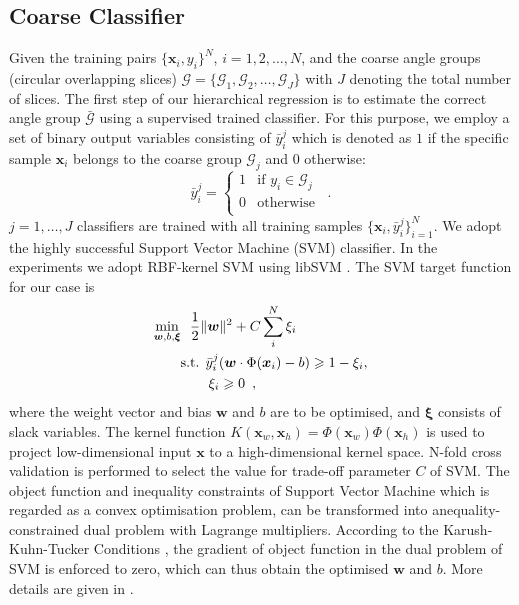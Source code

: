 \documentclass{tutmscthesis}[2010/09/22]
\numberwithin{equation}{section}
\numberwithin{table}{section}
\numberwithin{figure}{section}
\renewcommand{\vec}[1]{\bm{#1}}
\begin{document}
\subsection{Coarse Classifier}
\label{sec:coarse_classifier}
Given the training pairs $\{\vec{x}_{i}, y_{i}\}^N$,
$i=1, 2, \ldots, N$, and the coarse angle groups (circular
overlapping slices)
$\mathcal{G} = \{\mathcal{G}_1, \mathcal{G}_2, \ldots, \mathcal{G}_J\}$
with $J$ denoting the total number of slices. The first step
of our hierarchical regression is to estimate the correct angle
group $\bar{\mathcal{G}}$ using a supervised trained classifier.
For this purpose, we employ a set of binary output variables consisting of $\bar{y}_i^j$ which is denoted as $1$ if the specific sample $\vec{x}_i$ belongs to the coarse group $\mathcal{G}_j$ and $0$ otherwise:
\begin{equation}
\bar{y}_i^j =  \left\{ \begin{array}{ll}
1 & \textrm{if $y_i \in \mathcal{G}_j $}\\
0 & \textrm{otherwise}\\
\end{array} \right. \enspace .
\end{equation}
$j=1, \ldots, J$ classifiers are trained with all training samples
$\{\vec{x}_i,\bar{y}_i^j\}^N_{i=1}$. We adopt the highly successful
Support Vector Machine (SVM) classifier. In the experiments
we adopt RBF-kernel SVM using libSVM \cite{chang2011libsvm}.
The SVM target function for our case is
\begin{equation}
\begin{split}
  \min_{\vec{w},b,\vec{\xi}}&~~\frac{1}{2}\| \vec{w} \|^2+C\sum_i^N \xi_i\\
  &\hbox{s.t. } \bar{y}_i^j(\vec{w}\cdot \Phi(\vec{x}_i)-b) \geqslant 1 - \xi_i ,\\
  &      ~~~~~~\xi_i \geqslant 0 \enspace,
\end{split}\label{eq:svm}
\end{equation}
where the weight vector and bias $\vec{w}$ and $b$ are to be optimised,
and $\vec{\xi}$ consists of slack
variables. 
The kernel function $K(\vec{x}_w,\vec{x}_h)=\Phi(\vec{x}_w)\Phi(\vec{x}_h)$ is
used to project low-dimensional input $\vec{x}$ to a
high-dimensional kernel space. 
N-fold cross validation is performed to select the value for trade-off parameter $C$ of SVM. 
The object function and inequality constraints of Support Vector Machine which is regarded as a convex optimisation problem, can be transformed into anequality-constrained dual problem with Lagrange multipliers. 
According to the Karush-Kuhn-Tucker Conditions \cite{cortes1995support}, the gradient of object function in the dual problem of SVM is enforced to zero, which can thus obtain the optimised $\vec{w}$ and $b$. 
More details are given in \cite{chang2011libsvm}. 
\end{document}
